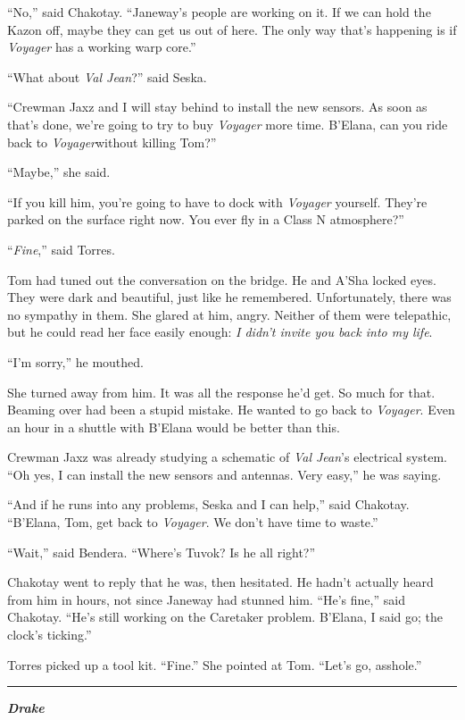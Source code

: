 \documentclass[twoside,letterpaper,12pt]{memoir}
\begin{document}
``No,'' said Chakotay. ``Janeway's people are working on it. If we can hold the Kazon off, maybe they can get us out of here. The only way that's happening is if \textit{Voyager} has a working warp core.''

``What about \textit{Val Jean}?'' said Seska.

``Crewman Jaxz and I will stay behind to install the new sensors. As soon as that's done, we're going to try to buy \textit{Voyager} more time. B'Elana, can you ride back to \textit{Voyager}without killing Tom?''

``Maybe,'' she said.

``If you kill him, you're going to have to dock with \textit{Voyager} yourself. They're parked on the surface right now. You ever fly in a Class N atmosphere?''

``\textit{Fine},'' said Torres.

Tom had tuned out the conversation on the bridge. He and A'Sha locked eyes. They were dark and beautiful, just like he remembered. Unfortunately, there was no sympathy in them. She glared at him, angry. Neither of them were telepathic, but he could read her face easily enough: \textit{I didn't invite you back into my life}.

``I'm sorry,'' he mouthed.

She turned away from him. It was all the response he'd get. So much for that. Beaming over had been a stupid mistake. He wanted to go back to \textit{Voyager}. Even an hour in a shuttle with B'Elana would be better than this.

Crewman Jaxz was already studying a schematic of \textit{Val Jean}'s electrical system. ``Oh yes, I can install the new sensors and antennas. Very easy,'' he was saying.

``And if he runs into any problems, Seska and I can help,'' said Chakotay. ``B'Elana, Tom, get back to \textit{Voyager}. We don't have time to waste.''

``Wait,'' said Bendera. ``Where’s Tuvok? Is he all right?''

Chakotay went to reply that he was, then hesitated. He hadn’t actually heard from him in hours, not since Janeway had stunned him. ``He's fine,'' said Chakotay. ``He's still working on the Caretaker problem. B'Elana, I said go; the clock's ticking.''

Torres picked up a tool kit. ``Fine.'' She pointed at Tom. ``Let's go, asshole.''

\fancybreak{\rule{3cm}{0.4 pt}}
\noindent\textit{\textbf{Drake}}\\
\end{document}
